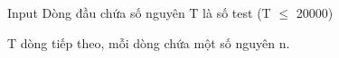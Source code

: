 Input
Dòng đầu chứa số nguyên T là số test (T  $\le$  20000)  

   T dòng tiếp theo, mỗi dòng chứa một số nguyên n.